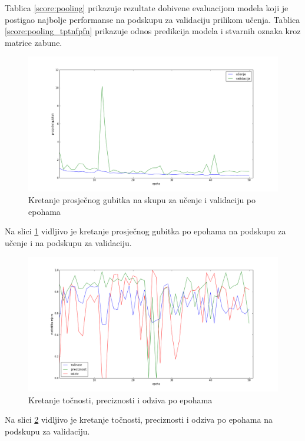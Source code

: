 \documentclass[times, utf8, diplomski, numeric]{fer}
\begin{document}
\noindent Tablica \ref{score:pooling} prikazuje rezultate dobivene evaluacijom modela koji je postigao najbolje performanse na podskupu za validaciju prilikom učenja.
Tablica \ref{score:pooling_tptnfpfn} prikazuje odnos predikcija modela i stvarnih oznaka kroz matrice zabune.

\begin{figure}[H]
\centering
\includegraphics[scale=0.35]{images/pooling_loss.png}
\caption{Kretanje prosječnog gubitka na skupu za učenje i validaciju po epohama}
\label{img:pooling_loss}
\end{figure}
\noindent Na slici \ref{img:pooling_loss} vidljivo je kretanje prosječnog gubitka po epohama na podskupu za učenje i na podskupu za validaciju.

\begin{figure}[H]
\centering
\includegraphics[scale=0.35]{images/pooling_ac_ap.png}
\caption{Kretanje točnosti, preciznosti i odziva po epohama}
\label{img:pooling_ac_ap}
\end{figure}
\noindent Na slici \ref{img:pooling_ac_ap} vidljivo je kretanje točnosti, preciznosti i odziva po epohama na podskupu za validaciju.
\end{document}
